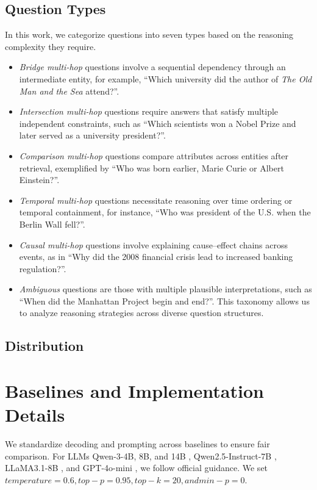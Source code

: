 \subsection{Question Types}
In this work, we categorize questions into seven types based on the reasoning complexity they require. 
\begin{itemize}
    \item \textit{Bridge multi-hop} questions involve a sequential dependency through an intermediate entity, for example, ``Which university did the author of \textit{The Old Man and the Sea} attend?''.
    \item  \textit{Intersection multi-hop} questions require answers that satisfy multiple independent constraints, such as ``Which scientists won a Nobel Prize and later served as a university president?''.
    \item \textit{Comparison multi-hop} questions compare attributes across entities after retrieval, exemplified by ``Who was born earlier, Marie Curie or Albert Einstein?''.
    \item \textit{Temporal multi-hop} questions necessitate reasoning over time ordering or temporal containment, for instance, ``Who was president of the U.S. when the Berlin Wall fell?''.
    \item \textit{Causal multi-hop} questions involve explaining cause–effect chains across events, as in ``Why did the 2008 financial crisis lead to increased banking regulation?''. 
    \item \textit{Ambiguous} questions are those with multiple plausible interpretations, such as ``When did the Manhattan Project begin and end?''. This taxonomy allows us to analyze reasoning strategies across diverse question structures.

\end{itemize}

\subsection{Distribution}


\section{Baselines and Implementation Details}
\label{app:baselin_model}
We standardize decoding and prompting across baselines to ensure fair comparison. For LLMs Qwen-3-4B, 8B, and 14B \citep{yang2025qwen3}, Qwen2.5-Instruct-7B \citep{hui2024qwen2}, LLaMA3.1-8B \citep{grattafiori2024llama}, and GPT-4o-mini \citep{hurst2024gpt}, we follow official guidance. We set $temperature = 0.6, top-p = 0.95, top-k = 20, and min-p = 0$. 


